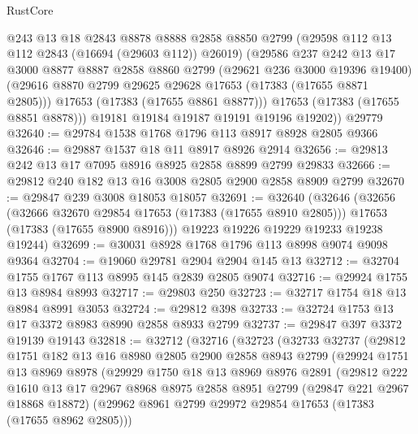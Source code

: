 \begin{lexlean}{RustCore}
\begin{coremodule}
          @243
          @13
          @18
          @2843
          @8878
          @8888
          @2858
          @8850
          @2799
          (@29598 @112 @13 @112 @2843 (@16694 (@29603 @112)) @26019)
          (@29586
            @237
            @242
            @13
            @17
            @3000
            @8877
            @8887
            @2858
            @8860
            @2799
            (@29621 @236 @3000 @19396 @19400)
            (@29616 @8870 @2799 @29625 @29628 @17653 (@17383 (@17655 @8871 @2805)))
            @17653
            (@17383 (@17655 @8861 @8877)))
          @17653
          (@17383 (@17655 @8851 @8878)))
        @19181
        @19184
        @19187
        @19191
        @19196
        @19202))
    @29779
@32640 := @29784 @1538 @1768 @1796 @113 @8917 @8928 @2805 @9366
@32646 := @29887 @1537 @18 @11 @8917 @8926 @2914
@32656 := @29813 @242 @13 @17 @7095 @8916 @8925 @2858 @8899 @2799 @29833
@32666 := @29812 @240 @182 @13 @16 @3008 @2805 @2900 @2858 @8909 @2799
@32670 := @29847 @239 @3008 @18053 @18057
@32691 := @32640
    (@32646
      (@32656
        (@32666 @32670 @29854 @17653 (@17383 (@17655 @8910 @2805)))
        @17653
        (@17383 (@17655 @8900 @8916)))
      @19223
      @19226
      @19229
      @19233
      @19238
      @19244)
@32699 := @30031 @8928 @1768 @1796 @113 @8998 @9074 @9098 @9364
@32704 := @19060 @29781 @2904 @2904 @145 @13
@32712 := @32704 @1755 @1767 @113 @8995 @145 @2839 @2805 @9074
@32716 := @29924 @1755 @13 @8984 @8993
@32717 := @29803 @250
@32723 := @32717 @1754 @18 @13 @8984 @8991 @3053
@32724 := @29812 @398
@32733 := @32724 @1753 @13 @17 @3372 @8983 @8990 @2858 @8933 @2799
@32737 := @29847 @397 @3372 @19139 @19143
@32818 := @32712
    (@32716
      (@32723
        (@32733
          @32737
          (@29812
            @1751
            @182
            @13
            @16
            @8980
            @2805
            @2900
            @2858
            @8943
            @2799
            (@29924
              @1751
              @13
              @8969
              @8978
              (@29929
                @1750
                @18
                @13
                @8969
                @8976
                @2891
                (@29812
                  @222
                  @1610
                  @13
                  @17
                  @2967
                  @8968
                  @8975
                  @2858
                  @8951
                  @2799
                  (@29847 @221 @2967 @18868 @18872)
                  (@29962 @8961 @2799 @29972 @29854 @17653 (@17383 (@17655 @8962 @2805)))

\end{coremodule}
\end{lexlean}
